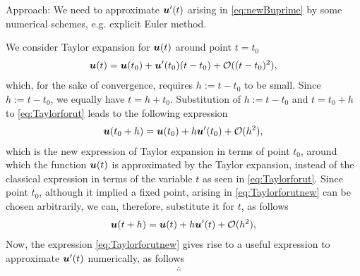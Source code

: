 \documentclass[12pt]{article}
\begin{document}
\begin{enumerate}[i)]
	      Approach:
	      We need to approximate ${\boldsymbol{\mathnormal u}}'(t)$ arising in 
	      \eqref{eq:newBuprime} by some numerical schemes, 
	      e.g. explicit Euler method.
	      \begin{observationboxed}
		      \label{eq:observationboxedtaylor}
		      We consider Taylor expansion 
		      for ${\boldsymbol{\mathnormal u}}(t)$ around point $t=t_{0}$
		      \begin{align}
			      \label{eq:Taylorforut}
			      {\boldsymbol{\mathnormal u}}(t)
			      = {\boldsymbol{\mathnormal u}}(t_{0}) + {\boldsymbol{\mathnormal u}}'(t_{0})(t-t_{0}) 
			      + \mathcal{O}((t-t_{0})^2),
		      \end{align}
		      which, for the sake of convergence, 
		      requires $h:=t-t_{0}$ to be small.
		      Since $h:=t-t_{0}$, we equally have 
		      $t=h+t_{0}$. Substitution
		      of $h:=t-t_{0}$ and $t=t_{0}+h$
		      to \eqref{eq:Taylorforut}
		      leads to the following expression
		      \begin{align}
			      \label{eq:Taylorforutnew}
			      {\boldsymbol{\mathnormal u}}(t_{0}+h)
			      = {\boldsymbol{\mathnormal u}}(t_{0}) + h{\boldsymbol{\mathnormal u}}'(t_{0})
			      + \mathcal{O}(h^2),
		      \end{align}
		      which is the new expression of Taylor expansion 
		      in terms of point $t_{0}$,
		      around which the function ${\boldsymbol{\mathnormal u}}(t)$
		      is approximated by the Taylor expansion,
		      instead of the classical expression 
		      in terms of the variable $t$
		      as seen in \eqref{eq:Taylorforut}.
		      Since point $t_{0}$, 
		      although it implied a fixed point,
		      arising in \eqref{eq:Taylorforutnew}
		      can be chosen arbitrarily, 
		      we can, therefore, substitute it for $t$, 
		      as follows
		      \begin{align}
			      \label{eq:Taylorforutnewnozero}
			      {\boldsymbol{\mathnormal u}}(t+h)
			      = {\boldsymbol{\mathnormal u}}(t) + h{\boldsymbol{\mathnormal u}}'(t)
			      + \mathcal{O}(h^2),
		      \end{align}
		      Now, the expression \eqref{eq:Taylorforutnew}
		      gives rise to a useful expression
		      to approximate ${\boldsymbol{\mathnormal u}}'(t)$ numerically, as follows
		      \begin{align}
			      \label{eq:Taylorforutnewnozerofinal}
			      \therefore\quad
			      \boxed{
}
\end{align}
\end{observationboxed}
\end{enumerate}
\end{document}
